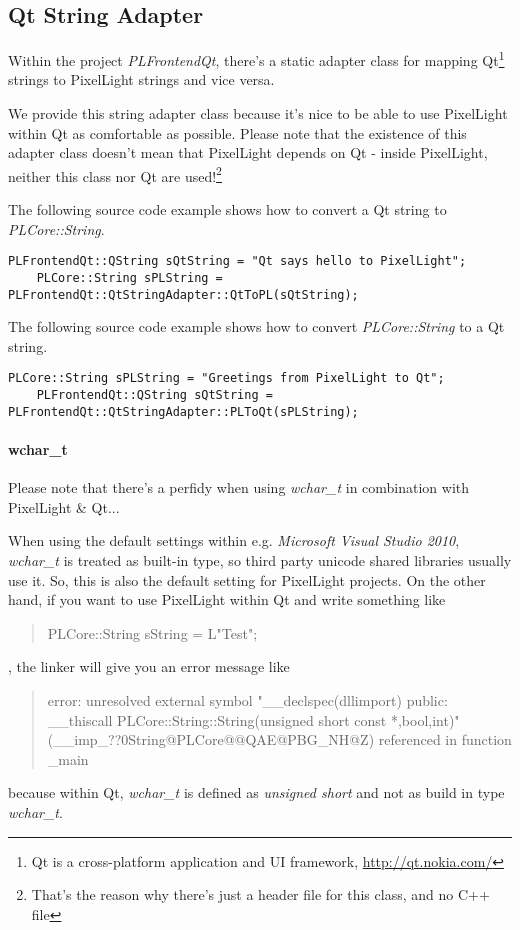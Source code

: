\subsection{Qt String Adapter}
Within the project \emph{PLFrontendQt}, there's a static adapter class for mapping Qt\footnote{Qt is a cross-platform application and \ac{UI} framework, \url{http://qt.nokia.com/}} strings to PixelLight strings and vice versa.

We provide this string adapter class because it's nice to be able to use PixelLight within Qt as comfortable as possible. Please note that the existence of this adapter class doesn't mean that PixelLight depends on Qt - inside PixelLight, neither this class nor Qt are used!\footnote{That's the reason why there's just a header file for this class, and no C++ file}

The following source code example shows how to convert a Qt string to \emph{PLCore::String}.
\begin{lstlisting}[caption=Qt string to PLCore::String]
	PLFrontendQt::QString sQtString = "Qt says hello to PixelLight";
	PLCore::String sPLString = PLFrontendQt::QtStringAdapter::QtToPL(sQtString);
\end{lstlisting}

The following source code example shows how to convert \emph{PLCore::String} to a Qt string.
\begin{lstlisting}[caption=PLCore::String string to Qt]
	PLCore::String sPLString = "Greetings from PixelLight to Qt";
	PLFrontendQt::QString sQtString = PLFrontendQt::QtStringAdapter::PLToQt(sPLString);
\end{lstlisting}


\paragraph{wchar\_t}
Please note that there's a perfidy when using \emph{wchar\_t} in combination with PixelLight \& Qt...

When using the default settings within e.g. \emph{Microsoft Visual Studio 2010}, \emph{wchar\_t} is treated as built-in type, so third party unicode shared libraries usually use it. So, this is also the default setting for PixelLight projects. On the other hand, if you want to use PixelLight within Qt and write something like \begin{quote}PLCore::String sString = L"Test";\end{quote}, the linker will give you an error message like \begin{quote}error:  unresolved external symbol "\_\_declspec(dllimport) public: \_\_thiscall PLCore::String::String(unsigned short const *,bool,int)" (\_\_imp\_??0String@PLCore@@QAE@PBG\_NH@Z) referenced in function \_main\end{quote} because within Qt, \emph{wchar\_t} is defined as \emph{unsigned short} and not as build in type \emph{wchar\_t}.


